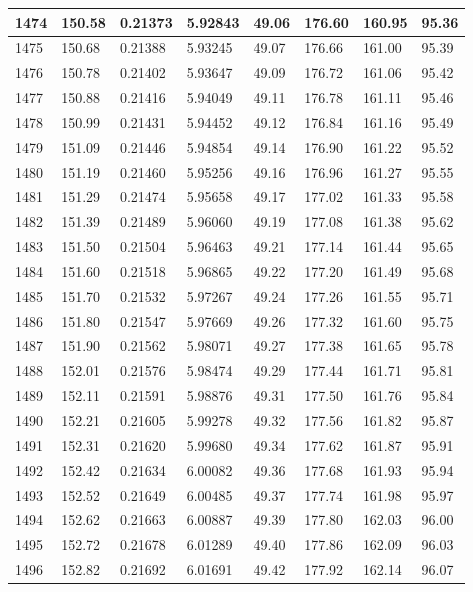 \documentclass[12pt,a4paper,twoside]{article}
\begin{document}
\begin{center}
\begin{longtable}{l l l l | l l l l}
1474 & 150.58 & 0.21373 & 5.92843 & 49.06 & 176.60 & 160.95 & 95.36 \\ \hline
1475 & 150.68 & 0.21388 & 5.93245 & 49.07 & 176.66 & 161.00 & 95.39 \\ \hline
1476 & 150.78 & 0.21402 & 5.93647 & 49.09 & 176.72 & 161.06 & 95.42 \\ \hline
1477 & 150.88 & 0.21416 & 5.94049 & 49.11 & 176.78 & 161.11 & 95.46 \\ \hline
1478 & 150.99 & 0.21431 & 5.94452 & 49.12 & 176.84 & 161.16 & 95.49 \\ \hline
1479 & 151.09 & 0.21446 & 5.94854 & 49.14 & 176.90 & 161.22 & 95.52 \\ \hline
1480 & 151.19 & 0.21460 & 5.95256 & 49.16 & 176.96 & 161.27 & 95.55 \\ \hline
1481 & 151.29 & 0.21474 & 5.95658 & 49.17 & 177.02 & 161.33 & 95.58 \\ \hline
1482 & 151.39 & 0.21489 & 5.96060 & 49.19 & 177.08 & 161.38 & 95.62 \\ \hline
1483 & 151.50 & 0.21504 & 5.96463 & 49.21 & 177.14 & 161.44 & 95.65 \\ \hline
1484 & 151.60 & 0.21518 & 5.96865 & 49.22 & 177.20 & 161.49 & 95.68 \\ \hline
1485 & 151.70 & 0.21532 & 5.97267 & 49.24 & 177.26 & 161.55 & 95.71 \\ \hline
1486 & 151.80 & 0.21547 & 5.97669 & 49.26 & 177.32 & 161.60 & 95.75 \\ \hline
1487 & 151.90 & 0.21562 & 5.98071 & 49.27 & 177.38 & 161.65 & 95.78 \\ \hline
1488 & 152.01 & 0.21576 & 5.98474 & 49.29 & 177.44 & 161.71 & 95.81 \\ \hline
1489 & 152.11 & 0.21591 & 5.98876 & 49.31 & 177.50 & 161.76 & 95.84 \\ \hline
1490 & 152.21 & 0.21605 & 5.99278 & 49.32 & 177.56 & 161.82 & 95.87 \\ \hline
1491 & 152.31 & 0.21620 & 5.99680 & 49.34 & 177.62 & 161.87 & 95.91 \\ \hline
1492 & 152.42 & 0.21634 & 6.00082 & 49.36 & 177.68 & 161.93 & 95.94 \\ \hline
1493 & 152.52 & 0.21649 & 6.00485 & 49.37 & 177.74 & 161.98 & 95.97 \\ \hline
1494 & 152.62 & 0.21663 & 6.00887 & 49.39 & 177.80 & 162.03 & 96.00 \\ \hline
1495 & 152.72 & 0.21678 & 6.01289 & 49.40 & 177.86 & 162.09 & 96.03 \\ \hline
1496 & 152.82 & 0.21692 & 6.01691 & 49.42 & 177.92 & 162.14 & 96.07 \\ \hline

\end{longtable}
\end{center}
\end{document}
